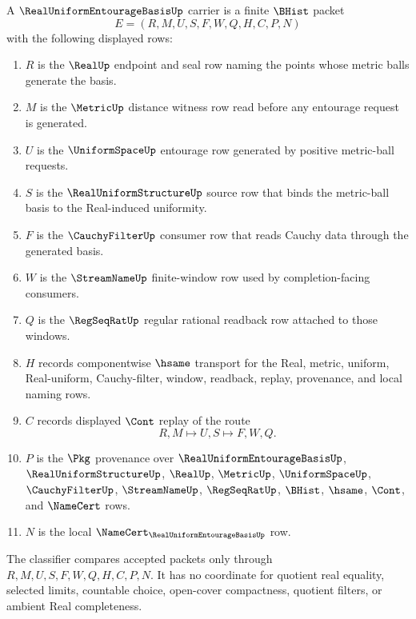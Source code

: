 \begin{definition}
\label{def:real-uniform-entourage-basis-carrier}
A $\RealUniformEntourageBasisUp$ carrier is a finite $\BHist$ packet
$$
E=(R,M,U,S,F,W,Q,H,C,P,N)
$$
with the following displayed rows:
\begin{enumerate}
\item $R$ is the $\RealUp$ endpoint and seal row naming the points whose metric balls generate the basis.
\item $M$ is the $\MetricUp$ distance witness row read before any entourage request is generated.
\item $U$ is the $\UniformSpaceUp$ entourage row generated by positive metric-ball requests.
\item $S$ is the $\RealUniformStructureUp$ source row that binds the metric-ball basis to the Real-induced uniformity.
\item $F$ is the $\CauchyFilterUp$ consumer row that reads Cauchy data through the generated basis.
\item $W$ is the $\StreamNameUp$ finite-window row used by completion-facing consumers.
\item $Q$ is the $\RegSeqRatUp$ regular rational readback row attached to those windows.
\item $H$ records componentwise $\hsame$ transport for the Real, metric, uniform, Real-uniform, Cauchy-filter, window, readback, replay, provenance, and local naming rows.
\item $C$ records displayed $\Cont$ replay of the route
$$
R,M \longmapsto U,S \longmapsto F,W,Q .
$$
\item $P$ is the $\Pkg$ provenance over $\RealUniformEntourageBasisUp$, $\RealUniformStructureUp$, $\RealUp$, $\MetricUp$, $\UniformSpaceUp$, $\CauchyFilterUp$, $\StreamNameUp$, $\RegSeqRatUp$, $\BHist$, $\hsame$, $\Cont$, and $\NameCert$ rows.
\item $N$ is the local $\NameCert_{\RealUniformEntourageBasisUp}$ row.
\end{enumerate}
The classifier compares accepted packets only through $R,M,U,S,F,W,Q,H,C,P,N$. It has no coordinate for quotient real equality, selected limits, countable choice, open-cover compactness, quotient filters, or ambient Real completeness.
\end{definition}

